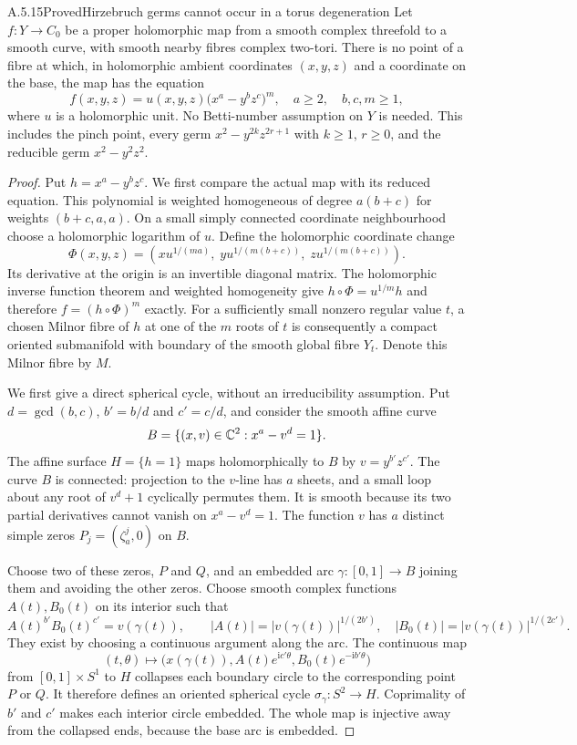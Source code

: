 \begin{statement}{A.5.15}{Proved}{Hirzebruch germs cannot occur in a torus degeneration}
Let $f:Y\to C_0$ be a proper holomorphic map from a
smooth complex threefold to a smooth curve, with smooth
nearby fibres complex two-tori. There is no point of
a fibre at which, in holomorphic ambient coordinates
$(x,y,z)$ and a coordinate on the base, the map has
the equation
\[
 f(x,y,z)=u(x,y,z)\bigl(x^a-y^bz^c\bigr)^m,
 \quad a\ge2,\quad b,c,m\ge1,                                    \tag{A.J.33}
\]
where $u$ is a holomorphic unit. No Betti-number
assumption on $Y$ is needed. This includes the pinch
point, every germ $x^2-y^{2k}z^{2r+1}$ with
$k\ge1$, $r\ge0$, and the reducible germ
$x^2-y^2z^2$.
\end{statement}
\begin{proof}
Put $h=x^a-y^bz^c$. We first compare the actual map
with its reduced equation. This polynomial is weighted
homogeneous of degree $a(b+c)$ for weights
$(b+c,a,a)$. On a small simply connected coordinate
neighbourhood choose a holomorphic logarithm of $u$.
Define the holomorphic coordinate change
\[
 \Phi(x,y,z)=\left(
 x u^{1/(ma)},\;
 y u^{1/(m(b+c))},\;
 z u^{1/(m(b+c))}\right).
                                                        \tag{A.J.34}
\]
Its derivative at the origin is an invertible diagonal
matrix. The holomorphic inverse function theorem and
weighted homogeneity give
$h\circ\Phi=u^{1/m}h$ and therefore
$f=(h\circ\Phi)^m$ exactly. For a sufficiently small
nonzero regular value $t$, a chosen Milnor fibre of
$h$ at one of the $m$ roots of $t$ is consequently a
compact oriented submanifold with boundary of the
smooth global fibre $Y_t$. Denote this Milnor fibre
by $M$.

We first give a direct spherical cycle, without an
irreducibility assumption. Put $d=\gcd(b,c)$,
$b'=b/d$ and $c'=c/d$, and consider the smooth affine
curve
\[
 B=\{(x,v)\in\mathbb C^2:x^a-v^d=1\}.
\]
The affine surface $H=\{h=1\}$ maps holomorphically
to $B$ by $v=y^{b'}z^{c'}$. The curve $B$ is
connected: projection to the $v$-line has $a$ sheets,
and a small loop about any root of $v^d+1$ cyclically
permutes them. It is smooth because its two partial
derivatives cannot vanish on $x^a-v^d=1$.
The function $v$ has $a$ distinct simple zeros
$P_j=(\zeta_a^j,0)$ on $B$.

Choose two of these zeros, $P$ and $Q$, and an
embedded arc $\gamma:[0,1]\to B$ joining them and
avoiding the other zeros. Choose smooth complex
functions $A(t),B_0(t)$ on its interior such that
\[
 A(t)^{b'}B_0(t)^{c'}=v(\gamma(t)),\qquad
 |A(t)|=|v(\gamma(t))|^{1/(2b')},\quad
 |B_0(t)|=|v(\gamma(t))|^{1/(2c')}.
\]
They exist by choosing a continuous argument along
the arc. The continuous map
\[
 (t,\theta)\longmapsto
 \bigl(x(\gamma(t)),A(t)e^{\mathrm i c'\theta},
                 B_0(t)e^{-\mathrm i b'\theta}\bigr)
                                                        \tag{A.J.33a}
\]
from $[0,1]\times S^1$ to $H$ collapses each boundary
circle to the corresponding point $P$ or $Q$.
It therefore defines an oriented spherical cycle
$\sigma_\gamma:S^2\to H$. Coprimality of $b'$ and
$c'$ makes each interior circle embedded. The whole
map is injective away from the collapsed ends,
because the base arc is embedded.


\end{proof}
